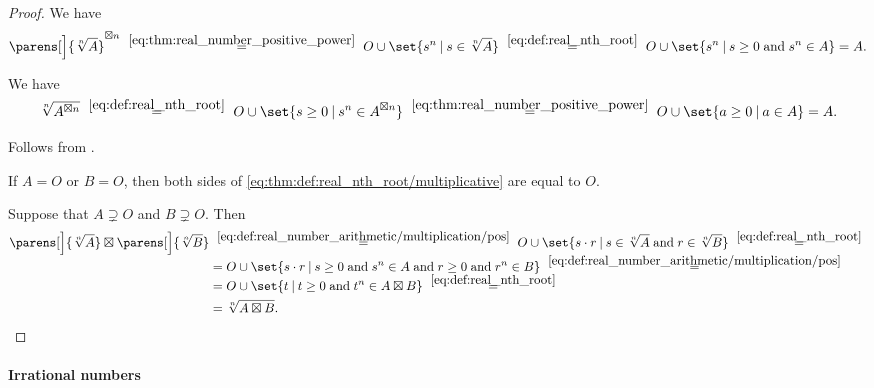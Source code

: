 \begin{proof}
   We have
  \begin{equation*}
    \parens[\Big]{ \sqrt[n]{ A } }^{\boxtimes n}
    \reloset{\eqref{eq:thm:real_number_positive_power}} =
    O \cup \set{ s^n \given s \in \sqrt[n]{ A } }
    \reloset{\eqref{eq:def:real_nth_root}} =
    O \cup \set{ s^n \given s \geq 0 \T{and} s^n \in A }
    =
    A.
  \end{equation*}

   We have
  \begin{equation*}
    \sqrt[n]{ A^{\boxtimes n} }
    \reloset{\eqref{eq:def:real_nth_root}} =
    O \cup \set{ s \geq 0 \given s^n \in A^{\boxtimes n} }
    \reloset{\eqref{eq:thm:real_number_positive_power}} =
    O \cup \set{ a \geq 0 \given a \in A }
    =
    A.
  \end{equation*}

   Follows from .

   If \( A = O \) or \( B = O \), then both sides of \eqref{eq:thm:def:real_nth_root/multiplicative} are equal to \( O \).

  Suppose that \( A \supsetneq O \) and \( B \supsetneq O \). Then
  \begin{align*}
    \parens[\Big]{\sqrt[n]{ A }} \boxtimes \parens[\Big]{\sqrt[n]{ B }}
    &\reloset {\eqref{eq:def:real_number_arithmetic/multiplication/pos}} =
    O \cup \set{ s \cdot r \given s \in \sqrt[n]{ A } \T{and} r \in \sqrt[n]{ B }}
    \reloset {\eqref{eq:def:real_nth_root}} = \\ &=
    O \cup \set{ s \cdot r \given s \geq 0 \T{and} s^n \in A \T{and} r \geq 0 \T{and} r^n \in B }
    \reloset {\eqref{eq:def:real_number_arithmetic/multiplication/pos}} = \\ &=
    O \cup \set{ t \given t \geq 0 \T{and} t^n \in A \boxtimes B }
    \reloset {\eqref{eq:def:real_nth_root}} = \\ &=
    \sqrt[n]{ A \boxtimes B }.
  \end{align*}
\end{proof}

\paragraph{Irrational numbers}

